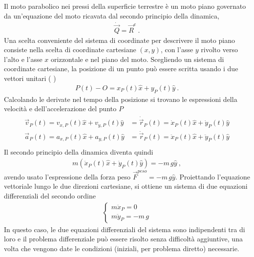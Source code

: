 \documentclass[letterpaper,10pt,italian]{jupyterBook}
\begin{document}
\sphinxAtStartPar
{} Il moto parabolico nei pressi della superficie terrestre è un moto piano governato da un’equazione del moto ricavata dal secondo principio della dinamica,
\begin{equation*}
\begin{split}\dot{\vec{Q}} = \vec{R}^e \ .\end{split}
\end{equation*}
\sphinxAtStartPar
Una scelta conveniente del sistema di coordinate per descrivere il moto piano consiste nella scelta di coordinate cartesiane \((x,y)\), con l’asse \(y\) rivolto verso l’alto e l’asse \(x\) orizzontale e nel piano del moto. Scegliendo un sistema di coordinate cartesiane, la posizione di un punto può essere scritta usando i due vettori unitari (  )
\begin{equation*}
\begin{split}P(t) - O = x_P(t) \hat{x} + y_P(t) \hat{y} \ .\end{split}
\end{equation*}
\sphinxAtStartPar
Calcolando le derivate nel tempo della posizione si trovano le espressioni della velocità e dell’accelerazione del punto \(P\)
\begin{equation*}
\begin{split}\begin{aligned}
  \vec{v}_P(t) = v_{x,P}(t) \hat{x} + v_{y,P}(t) \hat{y} & =  \dot{\vec{r}}_P(t) = \dot{x}_{P}(t) \hat{x} + \dot{y}_{P}(t) \hat{y} \\
  \vec{a}_P(t) = a_{x,P}(t) \hat{x} + a_{y,P}(t) \hat{y} & = \ddot{\vec{r}}_P(t) =\ddot{x}_{P}(t) \hat{x} +\ddot{y}_{P}(t) \hat{y} \\
\end{aligned}\end{split}
\end{equation*}
\sphinxAtStartPar
Il secondo principio della dinamica diventa quindi
\begin{equation*}
\begin{split}m ( \ddot{x}_P(t) \hat{x} + \ddot{y}_P(t) \hat{y}) = - m \, g \hat{y} \ ,\end{split}
\end{equation*}
\sphinxAtStartPar
avendo usato l’espressione della forza peso \(\vec{F}^{peso} = - m \, g \hat{y}\). Proiettando l’equazione vettoriale lungo le due direzioni cartesiane, si ottiene un sistema di due equazioni differenziali del secondo ordine
\begin{equation*}
\begin{split}\begin{cases}
  m \ddot{x}_P = 0 \\
  m \ddot{y}_P = - m \, g
\end{cases}\end{split}
\end{equation*}
\sphinxAtStartPar
In questo caso, le due equazioni differenziali del sistema sono indipendenti tra di loro e il problema differenziale può essere risolto senza difficoltà aggiuntive, una volta che vengono date le condizioni (iniziali, per problema diretto) necessarie.
\end{document}
